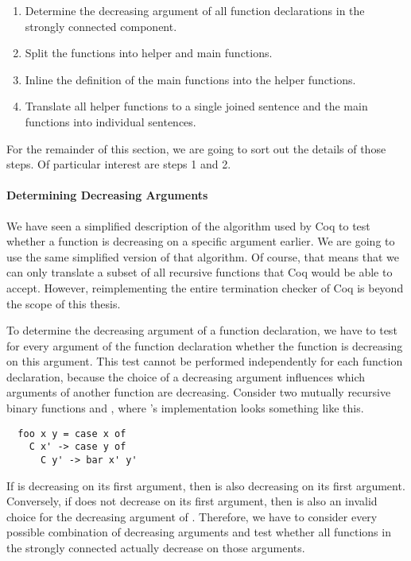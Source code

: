 \begin{enumerate}
  \item
  Determine the decreasing argument of all function declarations in the strongly connected component.
  \item
  Split the functions into helper and main functions.
  \item
  Inline the definition of the main functions into the helper functions.
  \item
  Translate all helper functions to a single joined  sentence and the main functions into individual  sentences.
\end{enumerate}

For the remainder of this section, we are going to sort out the details of those steps.
Of particular interest are steps 1 and 2.

\paragraph{Determining Decreasing Arguments}
We have seen a simplified description of the algorithm used by Coq to test whether a function is decreasing on a specific argument earlier.
We are going to use the same simplified version of that algorithm.
Of course, that means that we can only translate a subset of all recursive functions that Coq would be able to accept.
However, reimplementing the entire termination checker of Coq is beyond the scope of this thesis.

To determine the decreasing argument of a function declaration, we have to test for every argument of the function declaration whether the function is decreasing on this argument.
This test cannot be performed independently for each function declaration, because the choice of a decreasing argument influences which arguments of another function are decreasing.
Consider two mutually recursive binary functions  and , where 's implementation looks something like this.
\begin{verbatim}
  foo x y = case x of
    C x' -> case y of
      C y' -> bar x' y'
\end{verbatim}
If  is decreasing on its first argument, then  is also decreasing on its first argument.
Conversely, if  does not decrease on its first argument, then  is also an invalid choice for the decreasing argument of .
Therefore, we have to consider every possible combination of decreasing arguments and test whether all functions in the strongly connected actually decrease on those arguments.


